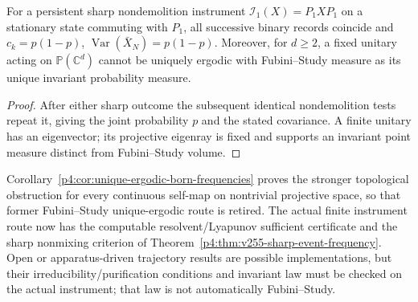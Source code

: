\documentclass[12pt,a4paper]{article}
\begin{document}
\begin{proposition}
\label{p4:prop:v2210-lit-frequency-obstructions}
For a persistent sharp nondemolition instrument
$\mathcal I_1(X)=P_1XP_1$ on a stationary state commuting with $P_1$,
all successive binary records coincide and
$c_k=p(1-p)$, $\operatorname{Var}(\bar X_N)=p(1-p)$.
Moreover, for $d\ge2$, a fixed unitary acting on $\mathbb P(\mathbb C^d)$
cannot be uniquely ergodic with Fubini--Study measure as its unique invariant
probability measure.
\end{proposition}
\begin{proof}
After either sharp outcome the subsequent identical nondemolition tests
repeat it, giving the joint probability $p$ and the stated covariance.
A finite unitary has an eigenvector; its projective eigenray is fixed and
supports an invariant point measure distinct from Fubini--Study volume.
\end{proof}
Corollary~\ref{p4:cor:unique-ergodic-born-frequencies} proves the stronger
topological obstruction for every continuous self-map on nontrivial
projective space, so that former Fubini--Study unique-ergodic route is
retired.  The actual finite instrument route now has the computable
resolvent/Lyapunov sufficient certificate and the sharp nonmixing criterion of
Theorem~\ref{p4:thm:v255-sharp-event-frequency}.
Open or apparatus-driven trajectory results
\cite{LitQFTBenoistTrajectories2019} are possible implementations, but their
irreducibility/purification conditions and invariant law must be checked on
the actual instrument; that law is not automatically Fubini--Study.
\end{document}

